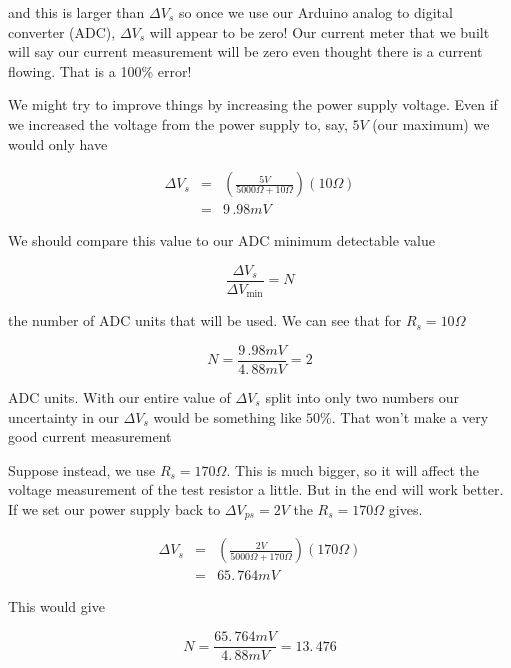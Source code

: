 \noindent and this is larger than $\Delta V_{s}$ so once we use our Arduino analog to digital converter (ADC), $\Delta V_{s}$ will appear to be zero! Our current meter that we built will say our current measurement will be zero even thought there is a current flowing. That is a 100\% error!

We might try to improve things by increasing the power supply voltage. Even
if we increased the voltage from the power supply to, say, $5\unit{V}$ (our
maximum) we would only have 

\begin{eqnarray*}
	\Delta V_{s}   &=&\left(\frac{5\unit{V}}{5000\unit{\Omega}+10\unit{\Omega}}\right) \left( 10\unit{\Omega}\right) \\
    &=&9\,.98\unit{mV}
\end{eqnarray*}

We should compare this value to our ADC minimum detectable value 

\begin{equation*}
	\frac{\Delta V_{s}}{\Delta V_{\min }}=N
\end{equation*}

\noindent the number of ADC units that will be used. We can see that for $R_{s}=10\unit{\Omega}$ 

\begin{equation*}
	N=\frac{9\,.98\unit{mV}}{4.\,\allowbreak 88\unit{mV}}=2
\end{equation*}

\noindent ADC units. With our entire value of $\Delta V_{s}$ split into only two numbers our uncertainty in our $\Delta V_{s}$ would be something like $50\%.$ That won't make a very good current measurement

Suppose instead, we use $R_{s}=170\unit{\Omega}.$  This is much bigger, so it will affect the voltage measurement of the test resistor a little. But in the end will work better. If we set our power supply back to $\Delta V_{ps}=2\unit{V}$ the $R_{s}=170\unit{\Omega}$ gives. 

\begin{eqnarray*}
	\Delta V_{s} &=&\left( \frac{2\unit{V}}{5000\unit{\Omega}+170\unit{\Omega}}\right) \left( 170\unit{\Omega}\right) \\
                 &=&65.\,\allowbreak 764\unit{mV}
\end{eqnarray*}

\noindent This would give 

\begin{equation*}
	N=\frac{65.\,\allowbreak 764\unit{mV}}{4.\,\allowbreak 88\unit{mV}}=13.\,\allowbreak 476
\end{equation*}

